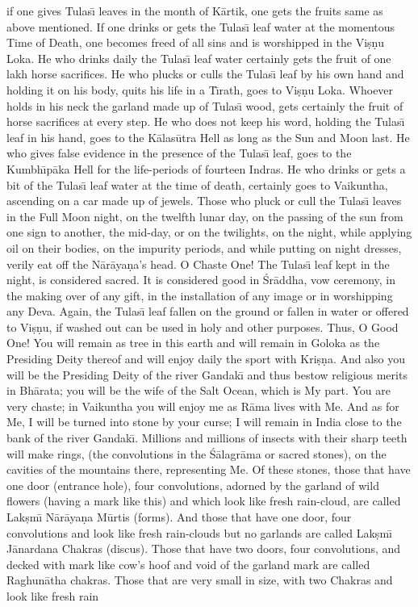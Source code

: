 if one gives Tulas\={\i} leaves in the month of K\=artik, one gets the fruits same as above mentioned. If one drinks or gets the Tulas\={\i} leaf water at the momentous Time of Death, one becomes freed of all sins and is worshipped in the Vi\d{s}\d{n}u Loka. He who drinks daily the Tulas\={\i} leaf water certainly gets the fruit of one lakh horse sacrifices. He who plucks or culls the Tulas\={\i} leaf by his own hand and holding it on his body, quits his life in a T\={\i}rath, goes to Vi\d{s}\d{n}u Loka. Whoever holds in his neck the garland made up of Tulas\={\i} wood, gets certainly the fruit of horse sacrifices at every step. He who does not keep his word, holding the Tulas\={\i} leaf in his hand, goes to the K\=alas\=utra Hell as long as the Sun and Moon last. He who gives false evidence in the presence of the Tulas\={\i} leaf, goes to the Kumbh\={\i}p\=aka Hell for the life-periods of fourteen Indras. He who drinks or gets a bit of the Tulas\={\i} leaf water at the time of death, certainly goes to Vaikuntha, ascending on a car made up of jewels. Those who pluck or cull the Tulas\={\i} leaves in the Full Moon night, on the twelfth lunar day, on the passing of the sun from one sign to another, the mid-day, or on the twilights, on the night, while applying oil on their bodies, on the impurity periods, and while putting on night dresses, verily eat off the N\=ar\=aya\d{n}a's head. O Chaste One! The Tulas\={\i} leaf kept in the night, is considered sacred. It is considered good in \'Sr\=addha, vow ceremony, in the making over of any gift, in the installation of any image or in worshipping any Deva. Again, the Tulas\={\i} leaf fallen on the ground or fallen in water or offered to Vi\d{s}\d{n}u, if washed out can be used in holy and other purposes. Thus, O Good One! You will remain as tree in this earth and will remain in Goloka as the Presiding Deity thereof and will enjoy daily the sport with Kri\d{s}\d{n}a. And also you will be the Presiding Deity of the river Gandak\={\i} and thus bestow religious merits in Bh\=arata; you will be the wife of the Salt Ocean, which is My part. You are very chaste; in Vaikuntha you will enjoy me as R\=ama lives with Me. And as for Me, I will be turned into stone by your curse; I will remain in India close to the bank of the river Gandak\={\i}. Millions and millions of insects with their sharp teeth will make rings, (the convolutions in the \'S\=alagr\=ama or sacred stones), on the cavities of the mountains there, representing Me. Of these stones, those that have one door (entrance hole), four convolutions, adorned by the garland of wild flowers (having a mark like this) and which look like fresh rain-cloud, are called Lak\d{s}m\={\i} N\=ar\=aya\d{n}a M\=urtis (forms). And those that have one door, four convolutions and look like fresh rain-clouds but no garlands are called Lak\d{s}m\={\i} J\=anardana Chakras (discus). Those that have two doors, four convolutions, and decked with mark like cow's hoof and void of the garland mark are called Raghun\=atha chakras. Those that are very small in size, with two Chakras and look like fresh rain

